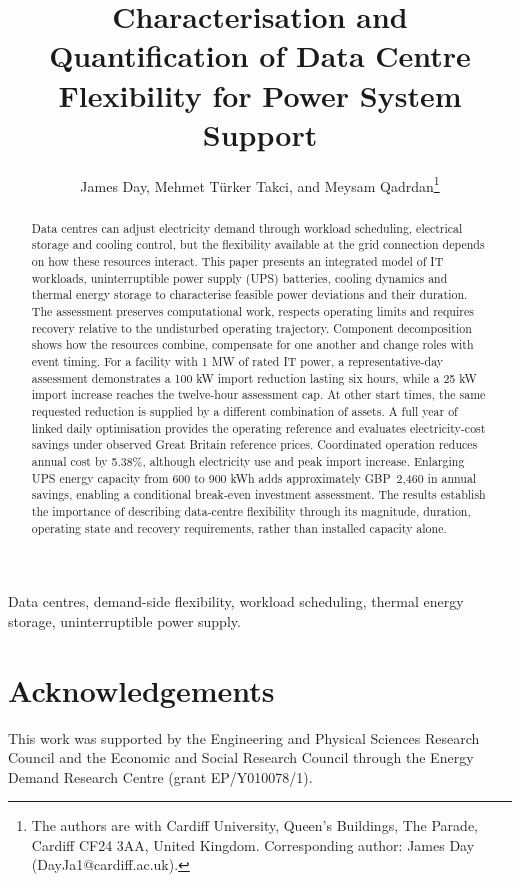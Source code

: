 \documentclass[journal]{IEEEtran}
\title{Characterisation and Quantification of Data Centre Flexibility for Power System Support}
\author{James Day, Mehmet T\"urker Takci, and Meysam Qadrdan\thanks{The authors are with Cardiff University, Queen's Buildings, The Parade, Cardiff CF24 3AA, United Kingdom. Corresponding author: James Day (DayJa1@cardiff.ac.uk).}}
\begin{document}
\maketitle
\begin{abstract}
Data centres can adjust electricity demand through workload scheduling, electrical storage and cooling control, but the flexibility available at the grid connection depends on how these resources interact. This paper presents an integrated model of IT workloads, uninterruptible power supply (UPS) batteries, cooling dynamics and thermal energy storage to characterise feasible power deviations and their duration. The assessment preserves computational work, respects operating limits and requires recovery relative to the undisturbed operating trajectory. Component decomposition shows how the resources combine, compensate for one another and change roles with event timing. For a facility with 1 MW of rated IT power, a representative-day assessment demonstrates a 100 kW import reduction lasting six hours, while a 25 kW import increase reaches the twelve-hour assessment cap. At other start times, the same requested reduction is supplied by a different combination of assets. A full year of linked daily optimisation provides the operating reference and evaluates electricity-cost savings under observed Great Britain reference prices. Coordinated operation reduces annual cost by 5.38\%, although electricity use and peak import increase. Enlarging UPS energy capacity from 600 to 900 kWh adds approximately GBP~2,460 in annual savings, enabling a conditional break-even investment assessment. The results establish the importance of describing data-centre flexibility through its magnitude, duration, operating state and recovery requirements, rather than installed capacity alone.
\end{abstract}
\begin{IEEEkeywords}
Data centres, demand-side flexibility, workload scheduling, thermal energy storage, uninterruptible power supply.
\end{IEEEkeywords}






\section*{Acknowledgements}
This work was supported by the Engineering and Physical Sciences Research Council and the Economic and Social Research Council through the Energy Demand Research Centre (grant EP/Y010078/1).
\end{document}
